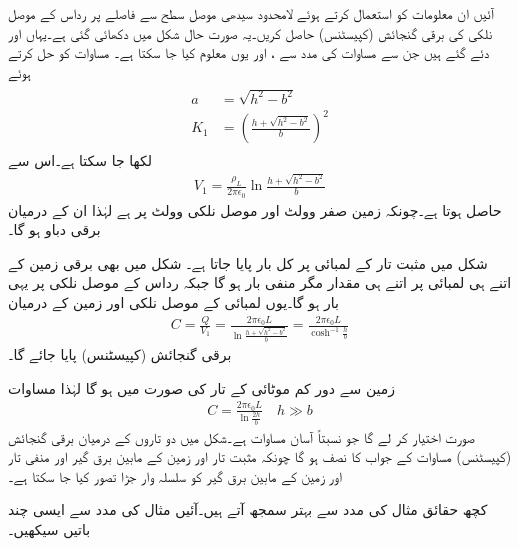 آئیں ان معلومات کو استعمال کرتے ہوئے لامحدود سیدھی موصل سطح  سے  فاصلے پر  رداس کے موصل نلکی کی برقی گنجائش (کپیسٹنس) حاصل کریں۔یہ صورت حال شکل  میں دکھائی گئی ہے۔یہاں  اور  دئے گئے ہیں جن سے مساوات  کی مدد سے ،  اور یوں  معلوم کیا جا سکتا ہے۔ مساوات  کو حل کرتے ہوئے
\begin{gather}
\begin{aligned}\label{مساوات_کپیسٹر_موصل_نلکی_زمین_متغیرات}
a&=\sqrt{h^2-b^2}\\
K_1&=\left(\frac{h+\sqrt{h^2-b^2}}{b}\right)^2
\end{aligned}
\end{gather} 
لکھا جا سکتا ہے۔اس سے
\begin{align*}
V_1=\frac{\rho_L}{2\pi\epsilon_0} \ln \frac{h+\sqrt{h^2-b^2}}{b}
\end{align*}
حاصل ہوتا ہے۔چونکہ زمین صفر وولٹ اور موصل نلکی  وولٹ پر ہے لہٰذا ان کے درمیان  برقی دباو ہو گا۔

شکل  میں مثبت تار کے  لمبائی پر کل بار  پایا جاتا ہے۔ شکل   میں بھی برقی زمین کے اتنے ہی لمبائی پر اتنے ہی مقدار مگر منفی بار ہو گا جبکہ  رداس کے موصل نلکی پر یہی  بار ہو گا۔یوں  لمبائی کے موصل نلکی اور زمین کے درمیان
\begin{align}\label{مساوات_کپیسٹر_نلکی_زمین_کپیسٹنس}
C=\frac{Q}{V_1}=\frac{2\pi\epsilon_0 L}{ \ln \frac{h+\sqrt{h^2-b^2}}{b}}=\frac{2\pi\epsilon_0 L}{\cosh^{-1} \frac{h}{b}}
\end{align}
برقی گنجائش (کپیسٹنس) پایا جائے گا۔

زمین سے دور کم موٹائی کے تار کی صورت میں  ہو گا لہٰذا مساوات 
\begin{align}\label{مساوات_کپیسٹر_نلکی_زمین_کپیسٹنس_ب}
C=\frac{2\pi\epsilon_0 L}{ \ln \frac{2h}{b}} \quad{h \gg b}
\end{align}
صورت اختیار کر لے گا جو نسبتاً آسان مساوات ہے۔شکل  میں دو تاروں کے درمیان برقی گنجائش (کپیسٹنس) مساوات  کے جواب کا نصف ہو گا چونکہ مثبت تار اور زمین کے مابین برق گیر اور منفی تار اور زمین کے مابین برق گیر کو سلسلہ وار جڑا تصور کیا جا سکتا ہے۔   

کچھ حقائق مثال کی مدد سے بہتر سمجھ آتے ہیں۔آئیں مثال  کی مدد سے ایسی چند باتیں سیکھیں۔

